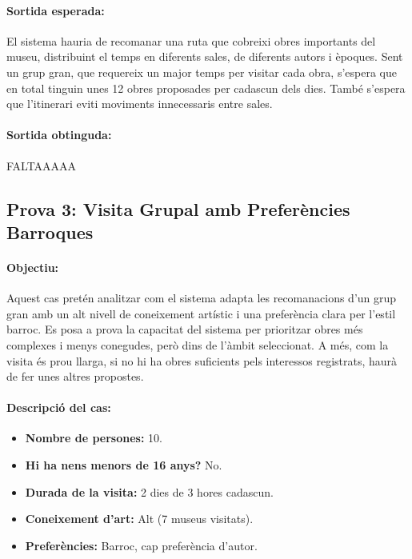 \documentclass[a4paper]{article}
\begin{document}
	\paragraph{Sortida esperada:}
	El sistema hauria de recomanar una ruta que cobreixi obres importants del museu, distribuint el temps en diferents sales, de diferents autors i èpoques. Sent un grup gran, que requereix un major temps per visitar cada obra, s'espera que en total tinguin unes 12 obres proposades per cadascun dels dies. També s’espera que l’itinerari eviti moviments innecessaris entre sales.
	
	\paragraph{Sortida obtinguda:} FALTAAAAA
	
	
	\subsection{Prova 3: Visita Grupal amb Preferències Barroques}
	
	\paragraph{Objectiu:} 
	Aquest cas pretén analitzar com el sistema adapta les recomanacions d'un grup gran amb un alt nivell de coneixement artístic i una preferència clara per l’estil barroc. Es posa a prova la capacitat del sistema per prioritzar obres més complexes i menys conegudes, però dins de l’àmbit seleccionat. A més, com la visita és prou llarga, si no hi ha obres suficients pels interessos registrats, haurà de fer unes altres propostes.
	
	\paragraph{Descripció del cas:} 
	
	\begin{itemize}
		\item \textbf{Nombre de persones:} 10.
		\item \textbf{Hi ha nens menors de 16 anys?} No.
		\item \textbf{Durada de la visita:} 2 dies de 3 hores cadascun.
		\item \textbf{Coneixement d’art:} Alt (7 museus visitats).
		\item \textbf{Preferències:} Barroc, cap preferència d'autor.
	\end{itemize}
	
\end{document}
